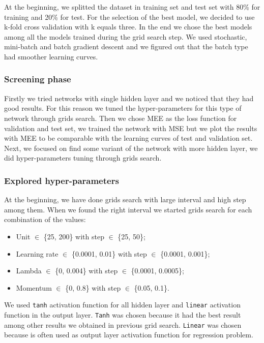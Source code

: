 At the beginning, we splitted the dataset in training set and test set with 80\% for training and 20\% for test. For the selection of the best model, we decided to use k-fold cross validation with k equals three. In the end we chose the best models among all the models trained during the grid search step. We used stochastic, mini-batch and batch gradient descent and we figured out that the batch type had smoother learning curves.

\subsubsection{Screening phase}

Firstly we tried networks with single hidden layer and we noticed that they had good results. For this reason we tuned the hyper-parameters for this type of network through grids search.
Then we chose MEE as the loss function for validation and test set, we trained the network with MSE but we plot the results with MEE to be comparable with the learning curves of test and validation set.
Next, we focused on find some variant of the network with more hidden layer, we did hyper-parameters tuning through grids search.

\subsubsection{Explored hyper-parameters}
At the beginning, we have done grids search with large interval and high step among them. When we found the right interval we started grids search for each combination of the values:

\begin{itemize}
	\item Unit $\in$ \{25, 200\} with step $\in$ \{25, 50\};
	\item Learning rate $\in$ \{0.0001, 0.01\} with step $\in$ \{0.0001, 0.001\};
	\item Lambda $\in$ \{0, 0.004\} with step $\in$ \{0.0001,  0.0005\};
	\item Momentum $\in$ \{0, 0.8\} with step $\in$ \{0.05,  0.1\}.
\end{itemize}
\vspace{0.3cm}
We used \texttt{tanh} activation function for all hidden layer and \texttt{linear} activation function in the output layer. \texttt{Tanh} was chosen because it had the best result among other results we obtained in previous grid search. \texttt{Linear} was chosen because is often used as output layer activation function for regression problem.

